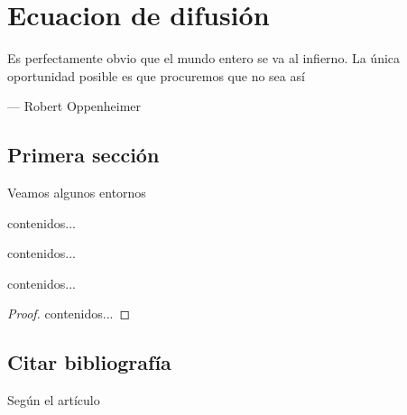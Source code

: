 {\justifying
	\chapter{Ecuacion de difusión}
	\epigraph{Es perfectamente obvio que el mundo entero se va al
		infierno. La única oportunidad posible es que procuremos que
		no sea así}{--- \textup{Robert Oppenheimer}}
	\section{Primera sección}
	Veamos algunos entornos
	\begin{mydef}{}{}
		contenidos...
	\end{mydef}
	\begin{mylem}{}{}
		contenidos...
	\end{mylem}
	\begin{mytheo}{}{}
		contenidos...
	\end{mytheo}
	\begin{proof}
		contenidos... 
	\end{proof}
	\section{Citar bibliografía}
	Según el artículo \cite{bib:exampleReference}
	\putbib %
}
\cleanalldata